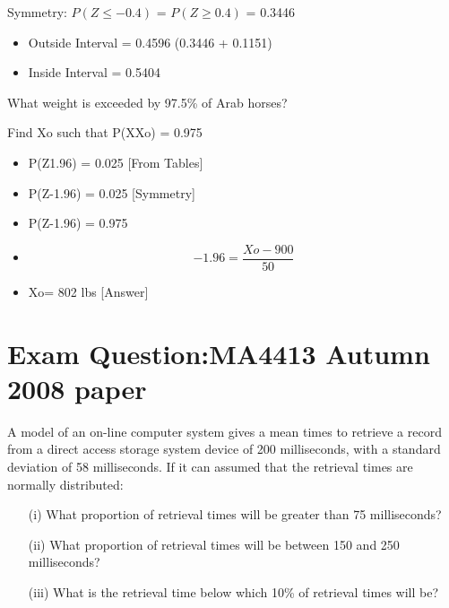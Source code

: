 ﻿\documentclass[]{report}
\begin{document}
Symmetry: 	$P(Z \leq -0.4)$ = $P(Z \geq 0.4)$ = 0.3446


\begin{itemize}
	\item Outside Interval = 0.4596        (0.3446 +  0.1151)
	\item Inside Interval = 0.5404
\end{itemize}



What weight is exceeded by 97.5\% of Arab horses?

Find Xo  such that P(XXo) = 0.975

\begin{itemize}
	\item 	P(Z1.96) = 0.025     [From Tables] 
	
	\item	P(Z-1.96) = 0.025  [Symmetry]
	
	\item	P(Z-1.96) = 0.975         
	
	\item	\[-1.96 = \frac{Xo- 900}{50} \]
	
	
	\item	Xo= 802 lbs  [Answer]
\end{itemize}	








\section{Exam Question:MA4413 Autumn 2008 paper}

	
		A model of an on-line computer system gives a mean times to retrieve a record from a direct access storage system device of 200 milliseconds, with a standard deviation of 58 milliseconds. If it can assumed that the retrieval times are normally distributed:
		
		\begin{itemize}
			\item[(i)] What proportion of retrieval times will be greater than 75 milliseconds?
			\item[(ii)] What proportion of retrieval times will be between 150 and 250 milliseconds?
			\item[(iii)] What is the retrieval time below which 10\% of retrieval times will be?
		\end{itemize}
		
\end{document}
